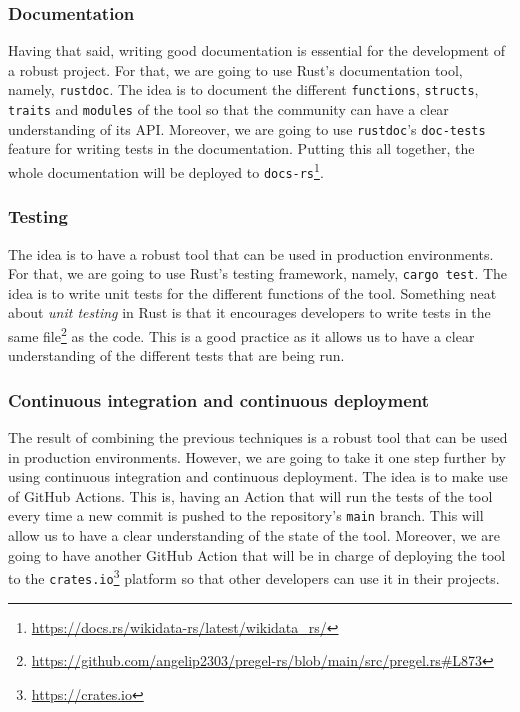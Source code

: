 \subsubsection{Documentation}

Having that said, writing good documentation is essential for the development of a robust project. For that, we are going to use Rust's documentation tool, namely, \texttt{rustdoc}. The idea is to document the different \texttt{functions}, \texttt{structs}, \texttt{traits} and \texttt{modules} of the tool so that the community can have a clear understanding of its API. Moreover, we are going to use \texttt{rustdoc}'s \texttt{doc-tests} feature for writing tests in the documentation. Putting this all together, the whole documentation will be deployed to \texttt{docs-rs}\footnote{\url{https://docs.rs/wikidata-rs/latest/wikidata_rs/}}.

\subsubsection{Testing}

The idea is to have a robust tool that can be used in production environments. For that, we are going to use Rust's testing framework, namely, \texttt{cargo test}. The idea is to write unit tests for the different functions of the tool. Something neat about \textit{unit testing} in Rust is that it encourages developers to write tests in the same file\footnote{\url{https://github.com/angelip2303/pregel-rs/blob/main/src/pregel.rs\#L873}} as the code. This is a good practice as it allows us to have a clear understanding of the different tests that are being run.

\subsubsection{Continuous integration and continuous deployment}

The result of combining the previous techniques is a robust tool that can be used in production environments. However, we are going to take it one step further by using continuous integration and continuous deployment. The idea is to make use of GitHub Actions. This is, having an Action that will run the tests of the tool every time a new commit is pushed to the repository's \texttt{main} branch. This will allow us to have a clear understanding of the state of the tool. Moreover, we are going to have another GitHub Action that will be in charge of deploying the tool to the \texttt{crates.io}\footnote{\url{https://crates.io}} platform so that other developers can use it in their projects.

